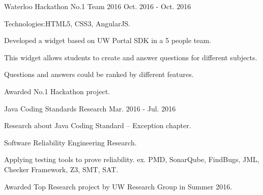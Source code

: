 \begin{cventries}  
    \cventry
    {}
    {Waterloo Hackathon No.1 Team 2016}
    {}
    {Oct. 2016 - Oct. 2016}
    {
      \begin{cvitems}
        \item {Technologies:\quad HTML5, CSS3, AngularJS.}
        \item {Developed a widget based on UW Portal SDK in a 5 people team.}
        \item {This widget allows students to create and answer questions for different subjects.}
        \item {Questions and answers could be ranked by different features.}
        \item {Awarded No.1 Hackathon project.}
      \end{cvitems}
    }
    
    \cventry
    {}
    {Java Coding Standards Research}
    {}
    {Mar. 2016 - Jul. 2016}
    {
      \begin{cvitems}
        \item {Research about Java Coding Standard -- Exception chapter.}
        \item {Software Reliability Engineering Research.}
        \item {Applying testing tools to prove reliability. ex. PMD, SonarQube, FindBugs, JML, Checker Framework, Z3, SMT, SAT.}
        \item {Awarded Top Research project by UW Research Group in Summer 2016.}
      \end{cvitems}
    }
\end{cventries}

